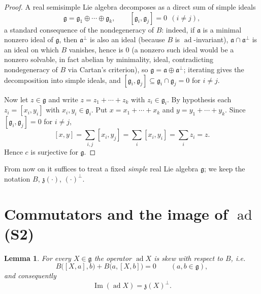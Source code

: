 \documentclass{amsart}
\newtheorem{lemma}{Lemma}
\theoremstyle{definition}
\begin{document}
\begin{proof}
A real semisimple Lie algebra decomposes as a direct sum of simple ideals
\[
  \mathfrak g=\mathfrak g_1\oplus\cdots\oplus\mathfrak g_k ,
  \qquad [\mathfrak g_i,\mathfrak g_j]=0\ \ (i\neq j),
\]
a standard consequence of the nondegeneracy of $B$: indeed, if $\mathfrak a$ is a
minimal nonzero ideal of $\mathfrak g$, then $\mathfrak a^{\perp}$ is also an ideal
(because $B$ is $\operatorname{ad}$-invariant), $\mathfrak a\cap\mathfrak a^{\perp}$
is an ideal on which $B$ vanishes, hence is $0$ (a nonzero such ideal would be a
nonzero solvable, in fact abelian by minimality, ideal, contradicting
nondegeneracy of $B$ via Cartan's criterion), so
$\mathfrak g=\mathfrak a\oplus\mathfrak a^{\perp}$; iterating gives the
decomposition into simple ideals, and $[\mathfrak g_i,\mathfrak g_j]\subseteq
\mathfrak g_i\cap\mathfrak g_j=0$ for $i\neq j$.

Now let $z\in\mathfrak g$ and write $z=z_1+\cdots+z_k$ with
$z_i\in\mathfrak g_i$. By hypothesis each $z_i=[x_i,y_i]$ with
$x_i,y_i\in\mathfrak g_i$. Put $x=x_1+\cdots+x_k$ and $y=y_1+\cdots+y_k$. Since
$[\mathfrak g_i,\mathfrak g_j]=0$ for $i\neq j$,
\[
  [x,y]=\sum_{i,j}[x_i,y_j]=\sum_{i}[x_i,y_i]=\sum_i z_i=z .
\]
Hence $c$ is surjective for $\mathfrak g$.
\end{proof}

From now on it suffices to treat a fixed \emph{simple} real Lie algebra
$\mathfrak g$; we keep the notation $B$, $\mathfrak z(\cdot)$, $(\cdot)^{\perp}$.

\section{Commutators and the image of $\operatorname{ad}$ (S2)}

\begin{lemma}\label{lem:image}
For every $X\in\mathfrak g$ the operator $\operatorname{ad}X$ is skew with respect to
$B$, i.e.
\begin{equation}\label{eq:skew}
  B\bigl([X,a],b\bigr)+B\bigl(a,[X,b]\bigr)=0\qquad(a,b\in\mathfrak g),
\end{equation}
and consequently
\begin{equation}\label{eq:image}
  \operatorname{Im}(\operatorname{ad}X)=\mathfrak z(X)^{\perp}.
\end{equation}
\end{lemma}
\end{document}
